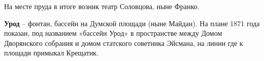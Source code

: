 На месте пруда в итоге возник театр Соловцова, ныне Франко.\\

\medskip

\textbf{Урод} – фонтан, бассейн на Думской площади (ныне Майдан). На плане 1871 года показан, под названием «бассейн Урод» в пространстве между Домом Дворянского собрания и домом статского советника Эйсмана, на линии где к площади примыкал Крещатик.
